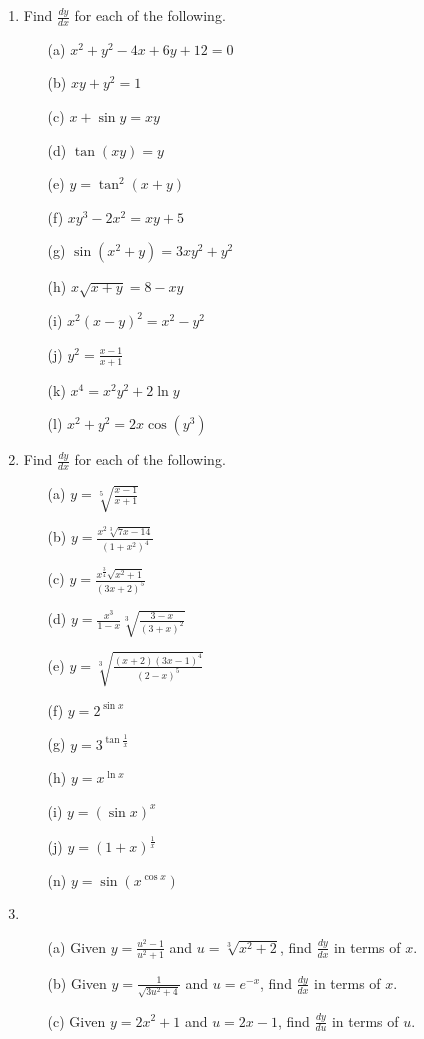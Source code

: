\documentclass[12pt]{article}
\newcommand{\ds}{\displaystyle}
\begin{document}
\begin{enumerate}
\begin{enumerate}
\end{enumerate}
\newpage
\item
Find $\ds \frac{dy}{dx}$ for each of the following.
\begin{enumerate}
\item[(a)] $x^2 + y^2 - 4x + 6y + 12 = 0$
\item[(b)] $xy + y^2 = 1$
\item[(c)] $x + \sin y = xy$
\item[(d)] $\tan(xy) = y$
\item[(e)] $y = \tan^2(x+y)$
\item[(f)] $xy^3 - 2x^2 = xy + 5$
\item[(g)] $\ds \sin\left(x^2 + y\right) = 3xy^2 + y^2$
\item[(h)] $x\sqrt{x+y} = 8 - xy$
\item[(i)] $x^2(x-y)^2 = x^2 - y^2$
\item[(j)] $\ds y^2 = \frac{x-1}{x+1}$
\item[(k)] $x^4 = x^2y^2 + 2\ln y$
\item[(l)] $\ds x^2 + y^2 = 2x\cos\left(y^3\right)$
\end{enumerate}

\item
Find $\ds \frac{dy}{dx}$ for each of the following.
\begin{enumerate}
\item[(a)] $\ds y = \sqrt[5]{\frac{x-1}{x+1}}$
\item[(b)] $\ds y = \frac{x^2 \sqrt[3]{7x-14}}{\left(1+x^2\right)^4}$
\item[(c)] $\ds y = \frac{x^{\frac{3}{4}} \sqrt{x^2 + 1}}{(3x+2)^5}$
\item[(d)] $\ds y = \frac{x^3}{1-x} \sqrt[3]{\frac{3-x}{(3+x)^2}}$
\item[(e)] $\ds y = \sqrt[3]{\frac{(x+2)(3x-1)^4}{(2-x)^5}}$
\item[(f)] $\ds y = 2^{\sin x}$
\item[(g)] $\ds y = 3^{\tan\frac{1}{x}}$
\item[(h)] $\ds y = x^{\ln x}$
\item[(i)] $\ds y = (\sin x)^x$
\item[(j)] $\ds y = (1+x)^{\frac{1}{x}}$
\item[(n)] $\ds y = \sin\left(x^{\cos x}\right)$
\end{enumerate}

\item
\begin{enumerate}
\item[(a)]
Given $\displaystyle{y=\frac{u^{2}-1}{u^{2}+1}}$ and $u=\sqrt[3]{x^{2}+2}$, find $\displaystyle{\frac{dy}{dx}}$ in terms of $x$.
\item[(b)]
Given $\displaystyle{y=\frac{1}{\sqrt{3u^2 + 4}}}$ and $u=e^{-x}$, find $\displaystyle{\frac{dy}{dx}}$ in terms of $x$.
\item[(c)]
Given $y = 2x^2 + 1$ and $u=2x-1$, find $\displaystyle{\frac{dy}{du}}$ in terms of $u$.
\end{enumerate}


\end{enumerate}
\end{document}
